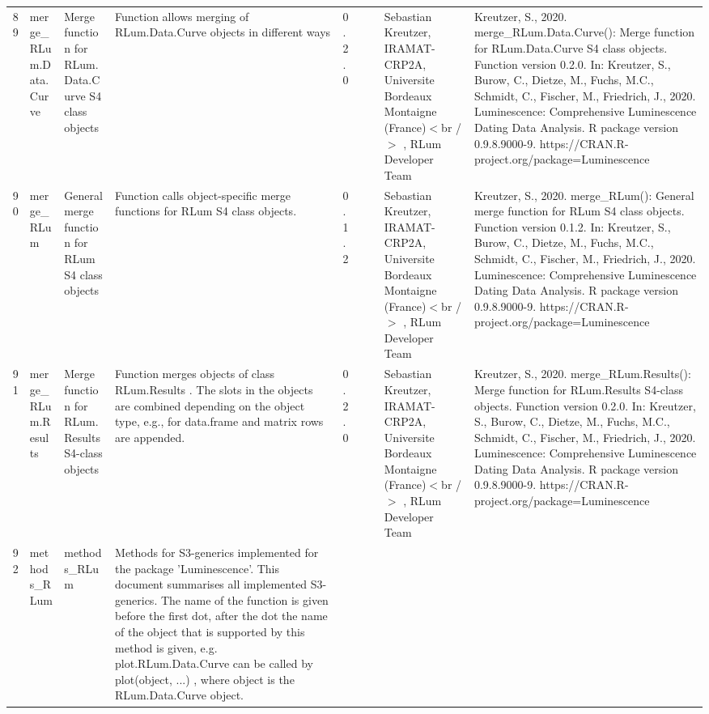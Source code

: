 \begin{table}[ht]
\begin{tabular}{rllllllll}
 \\ 
  89 & merge\_RLum.Data.Curve & Merge function for RLum.Data.Curve S4 class objects & Function allows merging of RLum.Data.Curve objects in different ways & 0.2.0
 &  &  & Sebastian Kreutzer, IRAMAT-CRP2A, Universite Bordeaux Montaigne (France)$<$br /$>$ , RLum Developer Team & Kreutzer, S., 2020. merge\_RLum.Data.Curve(): Merge function for RLum.Data.Curve S4 class objects. Function version 0.2.0. In: Kreutzer, S., Burow, C., Dietze, M., Fuchs, M.C., Schmidt, C., Fischer, M., Friedrich, J., 2020. Luminescence: Comprehensive Luminescence Dating Data Analysis. R package version 0.9.8.9000-9. https://CRAN.R-project.org/package=Luminescence
 \\ 
  90 & merge\_RLum & General merge function for RLum S4 class objects & Function calls object-specific merge functions for RLum S4 class objects. & 0.1.2
 &  &  & Sebastian Kreutzer, IRAMAT-CRP2A, Universite Bordeaux Montaigne (France)$<$br /$>$ , RLum Developer Team & Kreutzer, S., 2020. merge\_RLum(): General merge function for RLum S4 class objects. Function version 0.1.2. In: Kreutzer, S., Burow, C., Dietze, M., Fuchs, M.C., Schmidt, C., Fischer, M., Friedrich, J., 2020. Luminescence: Comprehensive Luminescence Dating Data Analysis. R package version 0.9.8.9000-9. https://CRAN.R-project.org/package=Luminescence
 \\ 
  91 & merge\_RLum.Results & Merge function for RLum.Results S4-class objects & Function merges objects of class  RLum.Results . The slots in the objects are combined depending on the object type, e.g., for  data.frame  and  matrix  rows are appended. & 0.2.0
 &  &  & Sebastian Kreutzer, IRAMAT-CRP2A, Universite Bordeaux Montaigne (France)$<$br /$>$ , RLum Developer Team & Kreutzer, S., 2020. merge\_RLum.Results(): Merge function for RLum.Results S4-class objects. Function version 0.2.0. In: Kreutzer, S., Burow, C., Dietze, M., Fuchs, M.C., Schmidt, C., Fischer, M., Friedrich, J., 2020. Luminescence: Comprehensive Luminescence Dating Data Analysis. R package version 0.9.8.9000-9. https://CRAN.R-project.org/package=Luminescence
 \\ 
  92 & methods\_RLum & methods\_RLum & Methods for S3-generics implemented for the package 'Luminescence'. This document summarises all implemented S3-generics. The name of the function is given before the first dot, after the dot the name of the object that is supported by this method is given, e.g.  plot.RLum.Data.Curve  can be called by  plot(object, ...) , where  object  is the  RLum.Data.Curve  object. &  &  &  &  &  \\ 

\end{tabular}
\end{table}

